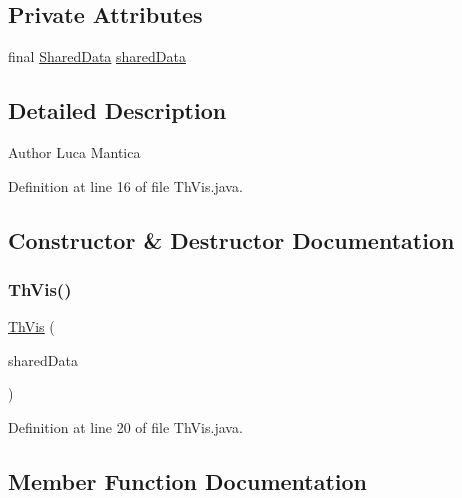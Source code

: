 \subsection*{Private Attributes}
\begin{DoxyCompactItemize}
\item 
final \mbox{\hyperlink{classmain_1_1_shared_data}{Shared\+Data}} \mbox{\hyperlink{classmain_1_1_th_vis_ac5f1128ef8d0ba91a8214e03732e2662}{shared\+Data}}
\end{DoxyCompactItemize}


\subsection{Detailed Description}
\begin{DoxyAuthor}{Author}
Luca Mantica 
\end{DoxyAuthor}


Definition at line 16 of file Th\+Vis.\+java.



\subsection{Constructor \& Destructor Documentation}
\mbox{\label{classmain_1_1_th_vis_aceb31c6e1bd06147c56dfaa16356dc88}} 
\subsubsection{\texorpdfstring{Th\+Vis()}{ThVis()}}
{\footnotesize\ttfamily \mbox{\hyperlink{classmain_1_1_th_vis}{Th\+Vis}} (\begin{DoxyParamCaption}\item[{\mbox{\hyperlink{classmain_1_1_shared_data}{Shared\+Data}}}]{shared\+Data }\end{DoxyParamCaption})}



Definition at line 20 of file Th\+Vis.\+java.



\subsection{Member Function Documentation}
\mbox{\label{classmain_1_1_th_vis_a13a43e6d814de94978c515cb084873b1}} 
